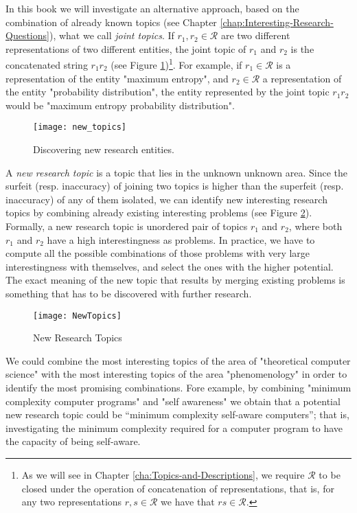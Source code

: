 In this book we will investigate an alternative approach, based on the combination of already known topics (see Chapter \ref{chap:Interesting-Research-Questions}), what we call \emph{joint topics}. If $r_1, r_2 \in \mathcal{R}$ are two different representations of two different entities, the joint topic of $r_1$ and $r_2$ is the concatenated string $r_1 r_2$ (see Figure \ref{fig:intro_new_topics})\footnote{As we will see in Chapter \ref{cha:Topics-and-Descriptions}, we require $\mathcal{R}$ to be closed under the operation of concatenation of representations, that is, for any two representations $r, s \in \mathcal{R}$ we have that $rs \in \mathcal{R}$.}. For example, if $r_1 \in \mathcal{R}$ is a representation of the entity "maximum entropy", and $r_2 \in \mathcal{R}$ a representation of the entity "probability distribution", the entity represented by the joint topic $r_1 r_2$ would be "maximum entropy probability distribution".

\begin{figure}[h]
\centering\texttt{[image: new\_topics]}
\caption{\label{fig:intro_new_topics}Discovering new research entities.}
\end{figure}

A \emph{new research topic} is a topic that lies in the unknown unknown area. Since the surfeit (resp. inaccuracy) of joining two topics is higher than the superfeit (resp. inaccuracy) of any of them isolated, we can identify new interesting research topics by combining already existing interesting problems (see Figure \ref{fig:NewTopics}). Formally, a new research topic is unordered pair of topics $r_1$ and $r_2$, where both $r_1$ and $r_2$ have a high interestingness as problems. In practice, we have to compute all the possible combinations of those problems with very large interestingness with themselves, and select the ones with the higher potential. The exact meaning of the new topic that results by merging existing problems is something that has to be discovered with further research.

\begin{figure}[h]
\centering\texttt{[image: NewTopics]}
\caption{\label{fig:NewTopics}New Research Topics}
\end{figure}

\begin{example}
We could combine the most interesting topics of the area of "theoretical computer science" with the most interesting topics of the area "phenomenology" in order to identify the most promising combinations. Fore example, by combining "minimum complexity computer programs" and "self awareness" we obtain that a potential new research topic could be “minimum complexity self-aware computers”; that is, investigating the minimum complexity required for a computer program to have the capacity of being self-aware.
\end{example}

